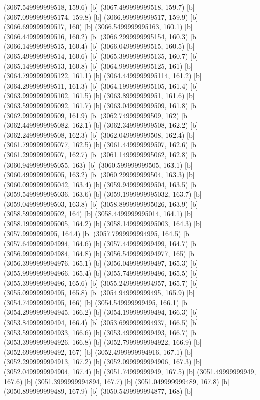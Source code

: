 {{{(3067.549999999518, 159.6) [b] 
(3067.499999999518, 159.7) [b] 
(3067.0999999995174, 159.8) [b] 
(3066.999999999517, 159.9) [b] 
(3066.699999999517, 160) [b] 
(3066.5499999995163, 160.1) [b] 
(3066.449999999516, 160.2) [b] 
(3066.2999999995154, 160.3) [b] 
(3066.149999999515, 160.4) [b] 
(3066.049999999515, 160.5) [b] 
(3065.499999999514, 160.6) [b] 
(3065.3999999995135, 160.7) [b] 
(3065.149999999513, 160.8) [b] 
(3064.9999999995125, 161) [b] 
(3064.7999999995122, 161.1) [b] 
(3064.4499999995114, 161.2) [b] 
(3064.299999999511, 161.3) [b] 
(3064.1999999995105, 161.4) [b] 
(3063.9999999995102, 161.5) [b] 
(3063.89999999951, 161.6) [b] 
(3063.5999999995092, 161.7) [b] 
(3063.049999999509, 161.8) [b] 
(3062.999999999509, 161.9) [b] 
(3062.749999999509, 162) [b] 
(3062.4499999995082, 162.1) [b] 
(3062.349999999508, 162.2) [b] 
(3062.249999999508, 162.3) [b] 
(3062.049999999508, 162.4) [b] 
(3061.7999999995077, 162.5) [b] 
(3061.449999999507, 162.6) [b] 
(3061.299999999507, 162.7) [b] 
(3061.1499999995062, 162.8) [b] 
(3060.9499999995055, 163) [b] 
(3060.599999999505, 163.1) [b] 
(3060.499999999505, 163.2) [b] 
(3060.299999999504, 163.3) [b] 
(3060.0999999995042, 163.4) [b] 
(3059.949999999504, 163.5) [b] 
(3059.5499999995036, 163.6) [b] 
(3059.1999999995032, 163.7) [b] 
(3059.049999999503, 163.8) [b] 
(3058.8999999995026, 163.9) [b] 
(3058.599999999502, 164) [b] 
(3058.4499999995014, 164.1) [b] 
(3058.1999999995005, 164.2) [b] 
(3058.1499999995003, 164.3) [b] 
(3057.9999999995, 164.4) [b] 
(3057.7999999994995, 164.5) [b] 
(3057.6499999994994, 164.6) [b] 
(3057.449999999499, 164.7) [b] 
(3056.9999999994984, 164.8) [b] 
(3056.5499999994977, 165) [b] 
(3056.3999999994976, 165.1) [b] 
(3056.049999999497, 165.3) [b] 
(3055.9999999994966, 165.4) [b] 
(3055.749999999496, 165.5) [b] 
(3055.399999999496, 165.6) [b] 
(3055.2499999994957, 165.7) [b] 
(3055.099999999495, 165.8) [b] 
(3054.949999999495, 165.9) [b] 
(3054.749999999495, 166) [b] 
(3054.549999999495, 166.1) [b] 
(3054.2999999994945, 166.2) [b] 
(3054.199999999494, 166.3) [b] 
(3053.849999999494, 166.4) [b] 
(3053.6999999994937, 166.5) [b] 
(3053.5999999994933, 166.6) [b] 
(3053.499999999493, 166.7) [b] 
(3053.3999999994926, 166.8) [b] 
(3052.7999999994922, 166.9) [b] 
(3052.699999999492, 167) [b] 
(3052.4999999994916, 167.1) [b] 
(3052.2999999994913, 167.2) [b] 
(3052.0999999994906, 167.3) [b] 
(3052.0499999994904, 167.4) [b] 
(3051.74999999949, 167.5) [b] 
(3051.49999999949, 167.6) [b] 
(3051.3999999994894, 167.7) [b] 
(3051.049999999489, 167.8) [b] 
(3050.899999999489, 167.9) [b] 
(3050.5499999994877, 168) [b] 
}}}
